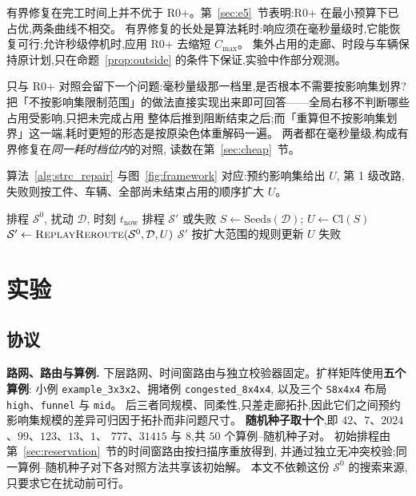 \documentclass[manuscript,screen,review]{acmart}
\newcommand{\NPairs}{50}
\begin{document}
有界修复在完工时间上并不优于 R0+。第~\ref{sec:e5}~节表明:R0+ 在最小预算下已占优,两条曲线不相交。
有界修复的长处是算法耗时:响应须在毫秒量级时,它能恢复可行;允许秒级停机时,应用 R0+ 去缩短 \(C_{\max}\)。
集外占用的走廊、时段与车辆保持原计划,只在命题~\ref{prop:outside} 的条件下保证,实验中作部分观测。

只与 R0+ 对照会留下一个问题:毫秒量级那一档里,是否根本不需要按影响集划界?
把「不按影响集限制范围」的做法直接实现出来即可回答——全局右移不判断哪些占用受影响,只把未完成占用
整体后推到阻断结束之后;而「重算但不按影响集划界」这一端,耗时更短的形态是按原染色体重解码一遍。
两者都在毫秒量级,构成有界修复在\emph{同一耗时档位内}的对照,
读数在第~\ref{sec:cheap}~节。

算法~\ref{alg:strc_repair} 与图~\ref{fig:framework} 对应:预约影响集给出 \(U\),
第 1 级改路,失败则按工件、车辆、全部尚未结束占用的顺序扩大 \(U\)。

\begin{algorithm}[t]
\caption{基于预约影响集的有界恢复(第 1 级改路 + 扩大范围)}
\label{alg:strc_repair}
\begin{algorithmic}[1]
\Require 排程 \(\mathcal{S}^0\), 扰动 \(\mathcal{D}\), 时刻 \(t_{\mathrm{now}}\)
\Ensure 排程 \(\mathcal{S}'\) 或失败
\State \(S \gets \mathrm{Seeds}(\mathcal{D})\);
      \(U \gets \mathrm{Cl}(S)\)
  \State \(\mathcal{S}' \gets \textsc{ReplayReroute}(\mathcal{S}^0,\mathcal{D},U)\)
    \State \Return \(\mathcal{S}'\)
  \EndIf
  \State 按扩大范围的规则更新 \(U\) 
\EndFor
\State \Return 失败
\end{algorithmic}
\end{algorithm}

\section{实验}
\label{sec:experiments}

\subsection{协议}
\label{sec:protocol}

\textbf{路网、路由与算例.}
下层路网、时间窗路由与独立校验器固定。扩样矩阵使用\textbf{五个算例}:
小例 \texttt{example\_3x3x2}、拥堵例 \texttt{congested\_8x4x4},
以及三个 \texttt{S8x4x4} 布局 \texttt{high}、\texttt{funnel} 与 \texttt{mid}。
后三者同规模、同柔性,只差走廊拓扑,因此它们之间预约影响集规模的差异可归因于拓扑而非问题尺寸。
\textbf{随机种子取十个},即 \(42\)、\(7\)、\(2024\)、\(99\)、\(123\)、\(13\)、\(1\)、
\(777\)、\(31415\) 与 \(8\),共 \(\NPairs\) 个算例--随机种子对。
初始排程由第~\ref{sec:reservation}~节的时间窗路由按扫描序重放得到,
并通过独立无冲突校验;同一算例--随机种子对下各对照方法共享该初始解。
本文不依赖这份 \(\mathcal{S}^0\) 的搜索来源,只要求它在扰动前可行。
\end{document}
